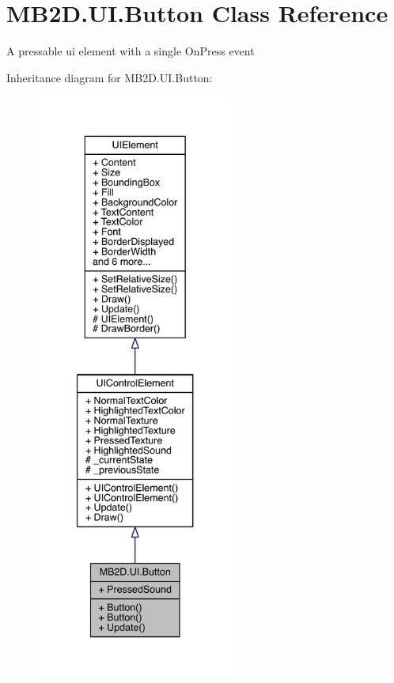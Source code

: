 \hypertarget{class_m_b2_d_1_1_u_i_1_1_button}{}\section{M\+B2\+D.\+U\+I.\+Button Class Reference}
\label{class_m_b2_d_1_1_u_i_1_1_button}


A pressable ui element with a single On\+Press event  




Inheritance diagram for M\+B2\+D.\+U\+I.\+Button\+:
\nopagebreak
\begin{figure}[H]
\begin{center}
\leavevmode
\includegraphics[height=550pt]{class_m_b2_d_1_1_u_i_1_1_button__inherit__graph}
\end{center}
\end{figure}


